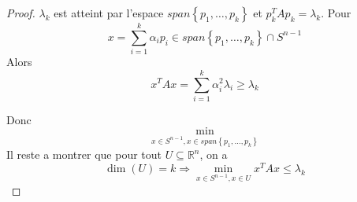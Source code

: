 \documentclass[../main.tex]{subfiles}
\begin{document}
\begin{proof}
$\lambda_k$ est atteint par l'espace $span \left\{ p_1, \ldots, p_k \right\} $ et $p_k^{T} A p_k= \lambda_k$.
Pour 
\[ 
x= \sum_{i=1}^{ k} \alpha_i p_i \in span \left\{ p_1, \ldots,p_k \right\} \cap S^{n-1}
\]
Alors
\[ 
x^{T}A x = \sum_{i=1}^{ k} \alpha_i^{2}\lambda_i \geq \lambda_k	
\]
 
Donc
\[ 
\min_{x\in S^{n-1}, x \in span \left\{ p_1, \ldots, p_k \right\} } 
\]
Il reste a montrer que pour tout $U \subseteq \mathbb{R}^n$, on a 
\[ 
	\dim( U) = k \Rightarrow \min_{x\in S^{n-1}, x\in U} x^{T}A x \leq \lambda_k
\]

\end{proof}
\end{document}
